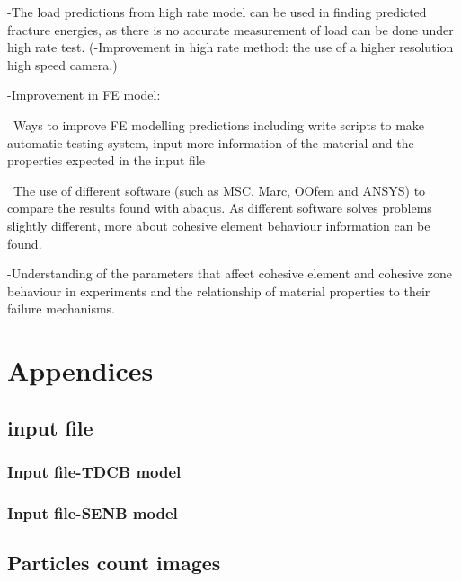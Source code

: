 \documentclass[numbers=noendperiod,chapterprefix=on]{icldt} %
\begin{document}
-The load predictions from high rate model can be used in finding predicted fracture energies, as there is no accurate measurement of load can be done under high rate test.
(-Improvement in high rate method: the use of a higher resolution high speed camera.)

-Improvement in FE model:

~Ways to improve FE modelling predictions including write scripts to make automatic testing system, input more information of the material and the properties expected in the input file 

~The use of different software (such as MSC. Marc, OOfem and ANSYS) to compare the results found with abaqus. As different software solves problems slightly different, more about cohesive element behaviour information can be found.

-Understanding of the parameters that affect cohesive element and cohesive zone behaviour in experiments and the relationship of material properties to their failure mechanisms. 




\renewcommand{\bibname}{References}






\appendix
\chapter{Appendices} \label{Appendices}

\section{input file} \label{Appendices_input_file}

\subsection{Input file-TDCB model} 


\subsection{Input file-SENB model}


\section{Particles count images} \label{Appendices_particles_count}
\end{document}
